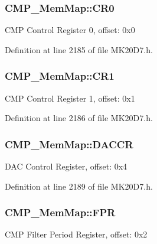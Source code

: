 \subsubsection[{\texorpdfstring{C\+R0}{CR0}}]{ C\+M\+P\+\_\+\+Mem\+Map\+::\+C\+R0}\hypertarget{struct_c_m_p___mem_map_ad56a4dbaba4426c89e4d9b256173ab84}{}\label{struct_c_m_p___mem_map_ad56a4dbaba4426c89e4d9b256173ab84}
C\+MP Control Register 0, offset\+: 0x0 

Definition at line 2185 of file M\+K20\+D7.\+h.

\subsubsection[{\texorpdfstring{C\+R1}{CR1}}]{ C\+M\+P\+\_\+\+Mem\+Map\+::\+C\+R1}\hypertarget{struct_c_m_p___mem_map_ab790f5d18ef53ba0c9cfc2b5f3ce6668}{}\label{struct_c_m_p___mem_map_ab790f5d18ef53ba0c9cfc2b5f3ce6668}
C\+MP Control Register 1, offset\+: 0x1 

Definition at line 2186 of file M\+K20\+D7.\+h.

\subsubsection[{\texorpdfstring{D\+A\+C\+CR}{DACCR}}]{ C\+M\+P\+\_\+\+Mem\+Map\+::\+D\+A\+C\+CR}\hypertarget{struct_c_m_p___mem_map_a64ad86546fe53058b6fdd5ca1252f7c2}{}\label{struct_c_m_p___mem_map_a64ad86546fe53058b6fdd5ca1252f7c2}
D\+AC Control Register, offset\+: 0x4 

Definition at line 2189 of file M\+K20\+D7.\+h.

\subsubsection[{\texorpdfstring{F\+PR}{FPR}}]{ C\+M\+P\+\_\+\+Mem\+Map\+::\+F\+PR}\hypertarget{struct_c_m_p___mem_map_aa793447f43fa77759b6eaf1620bed4bc}{}\label{struct_c_m_p___mem_map_aa793447f43fa77759b6eaf1620bed4bc}
C\+MP Filter Period Register, offset\+: 0x2 

